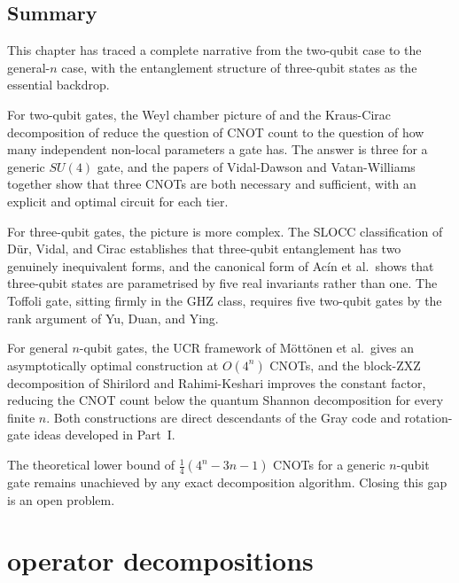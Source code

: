 \documentclass[12pt, a4paper, oneside]{report}
\theoremstyle{plain}
\theoremstyle{definition}
\theoremstyle{remark}
\begin{document}

\section{Summary}
\label{sec:ch3-summary}

This chapter has traced a complete narrative from the two-qubit case to the general-$n$
case, with the entanglement structure of three-qubit states as the essential backdrop.

For two-qubit gates, the Weyl chamber picture of  and the Kraus-Cirac
decomposition of  reduce the question of CNOT count to the question
of how many independent non-local parameters a gate has. The answer is three for a generic
$SU(4)$ gate, and the papers of Vidal-Dawson and Vatan-Williams together show that three
CNOTs are both necessary and sufficient, with an explicit and optimal circuit for each tier.

For three-qubit gates, the picture is more complex. The SLOCC classification of Dür, Vidal,
and Cirac establishes that three-qubit entanglement has two genuinely inequivalent forms,
and the canonical form of Acín et al.\ shows that three-qubit states are parametrised by
five real invariants rather than one. The Toffoli gate, sitting firmly in the GHZ class,
requires five two-qubit gates by the rank argument of Yu, Duan, and Ying.

For general $n$-qubit gates, the UCR framework of Möttönen et al.\ gives an asymptotically
optimal construction at $O(4^n)$ CNOTs, and the block-ZXZ decomposition of Shirilord and
Rahimi-Keshari improves the constant factor, reducing the CNOT count below the quantum
Shannon decomposition for every finite $n$. Both constructions are direct descendants of the
Gray code and rotation-gate ideas developed in Part~I.

The theoretical lower bound of $\frac{1}{4}(4^n - 3n - 1)$ CNOTs for a generic $n$-qubit
gate remains unachieved by any exact decomposition algorithm. Closing this gap is an open
problem.

\appendix
\chapter{operator decompositions}
\end{document}
